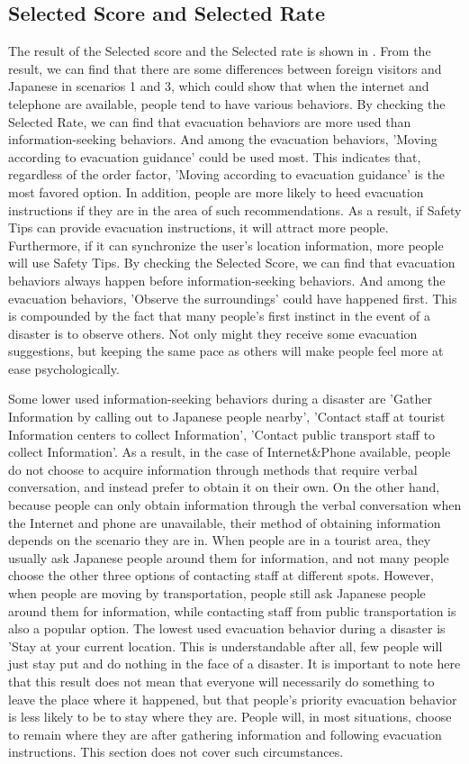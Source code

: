 \subsection{Selected Score and Selected Rate}
The result of the Selected score and the Selected rate is shown in . From the result, we can find that there are some differences between foreign visitors and Japanese in scenarios 1 and 3, which could show that when the internet and telephone are available, people tend to have various behaviors. By checking the Selected Rate, we can find that evacuation behaviors are more used than information-seeking behaviors. And among the evacuation behaviors, 'Moving according to evacuation guidance' could be used most. This indicates that, regardless of the order factor, 'Moving according to evacuation guidance' is the most favored option. In addition, people are more likely to heed evacuation instructions if they are in the area of such recommendations. As a result, if Safety Tips can provide evacuation instructions, it will attract more people. Furthermore, if it can synchronize the user's location information, more people will use Safety Tips. By checking the Selected Score, we can find that evacuation behaviors always happen before information-seeking behaviors. And among the evacuation behaviors, 'Observe the surroundings' could have happened first. This is compounded by the fact that many people's first instinct in the event of a disaster is to observe others. Not only might they receive some evacuation suggestions, but keeping the same pace as others will make people feel more at ease psychologically.

Some lower used information-seeking behaviors during a disaster are 'Gather Information by calling out to Japanese people nearby', 'Contact staff at tourist Information centers to collect Information', 'Contact public transport staff to collect Information'. As a result, in the case of Internet\&Phone available, people do not choose to acquire information through methods that require verbal conversation, and instead prefer to obtain it on their own. On the other hand, because people can only obtain information through the verbal conversation when the Internet and phone are unavailable, their method of obtaining information depends on the scenario they are in. When people are in a tourist area, they usually ask Japanese people around them for information, and not many people choose the other three options of contacting staff at different spots. However, when people are moving by transportation, people still ask Japanese people around them for information, while contacting staff from public transportation is also a popular option. The lowest used evacuation behavior during a disaster is 'Stay at your current location. This is understandable after all, few people will just stay put and do nothing in the face of a disaster. It is important to note here that this result does not mean that everyone will necessarily do something to leave the place where it happened, but that people's priority evacuation behavior is less likely to be to stay where they are. People will, in most situations, choose to remain where they are after gathering information and following evacuation instructions. This section does not cover such circumstances.

